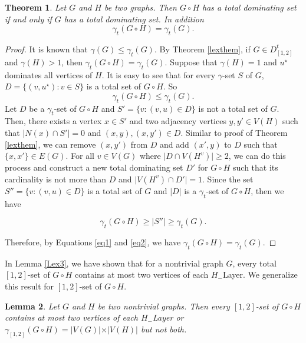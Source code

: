 \documentclass[A4,12pt]{article}
\newtheorem{theorem}{Theorem}[section]
\newtheorem{lemma}[theorem]{Lemma}
\theoremstyle{definition}
\theoremstyle{remark}
\begin{document}
\begin{theorem} \label{lexthemt}
	Let  $G$ and $H$ be two graphs. Then $G \circ H$ has a total dominating set if and only if $G$ has a total dominating set. In addition
$$	\gamma_t(G \circ H)=\gamma_t(G). $$
\end{theorem}

\begin{proof}
It is known that $\gamma(G)\leq \gamma_t(G )$. By Theorem \ref{lexthem}, if $ G \in D_{[1,2]}^t$ and $\gamma(H)>1$, then $\gamma_t(G \circ H)=\gamma_t(G )$.
Suppose that $\gamma(H)=1$ and $u^{\star}$ dominates all vertices of $H$.
It is easy to see that for every $\gamma$-set $S$ of $G$,   $D=\{(v,u^{\star}):v\in S \} $ is a total set of $G \circ H$. So
\begin{equation} \label{eq1}
\gamma_t(G\circ H) \leq \gamma_t(G).
\end{equation}
Let $D$ be  a $\gamma_t$-set of $G\circ H$  and $S'=\{v:(v,u)\in D\}$ is not a total set of $G$. Then, there exists a vertex $x\in S'$ and two adjacency vertices $y,y'\in V(H)$ such that $\vert N(x)\cap S'\vert =0$ and $(x,y), (x,y')\in D$.
Similar to proof of Theorem \ref{lexthem},  we can remove $(x,y')$ from $D$ and add $(x',y)$ to $D$ such that $\{x,x'\}\in E(G)$. For all $v\in V(G)$ where $\vert  D \cap V(H^v) \vert \geq 2$, we can do this process  and construct a new total dominating set $D'$ for $G\circ H$  such that its cardinality is not more than $D$  and $\vert V(H^v) \cap D' \vert =1$. Since the set $S''=\{v:(v,u)\in D\}$ is a total set of $G$ and  $\vert D\vert$ is a $\gamma_t$-set of $G \circ H$, then we have

 \begin{equation} \label{eq2}
 \gamma_t(G \circ H) \geq \vert S'' \vert \geq \gamma_t(G ).
 \end{equation}

  Therefore, by Equations \ref{eq1} and \ref{eq2}, we have $\gamma_t(G\circ H) = \gamma_t(G)$.

\end{proof}
	In Lemma \ref{Lex3}, we have shown  that for a nontrivial graph $G$, every total $[1,2]$-set of $G \circ H$
	 contains  at most two vertices of each $H_{-}$Layer. We generalize this result for  $[1,2]$-set of $G \circ H$.
	
	 \begin{lemma}
	 Let $G$ and $H$ be two nontrivial graphs. Then every $[1,2]$-set of $G \circ H$ contains  at most two vertices of each $H_{-}$Layer or $\gamma_{[1,2]}(G \circ H)=\vert V(G)\vert \times\vert V(H) \vert $ but not both.
	 	\end{lemma}
\end{document}
